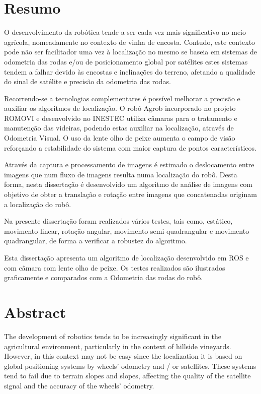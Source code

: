 \chapter*{Resumo}



O desenvolvimento da robótica tende a ser cada vez mais significativo no meio agrícola, nomeadamente no contexto de vinha de encosta. Contudo, este contexto pode não ser facilitador uma vez à localização no mesmo se baseia em sistemas de odometria das rodas e/ou de posicionamento global por satélites estes sistemas tendem a falhar devido às encostas  e inclinações do terreno, afetando a qualidade do sinal de satélite e precisão da odometria das rodas.

Recorrendo-se a  tecnologias complementares é possível melhorar a precisão e auxiliar os algoritmos de localização. O robô Agrob incorporado no projeto ROMOVI e desenvolvido no INESTEC  utiliza câmaras para o tratamento e manutenção das videiras, podendo estas auxiliar na localização, através de Odometria Visual. O uso da lente olho de peixe aumenta o campo de visão reforçando a estabilidade do sistema com maior captura de pontos característicos.

Através da captura e processamento de imagens é estimado o deslocamento entre imagens que num fluxo de imagens resulta numa localização do robô. Desta forma, nesta dissertação é desenvolvido um algoritmo de análise de imagens com objetivo de obter a translação e rotação entre imagens que concatenadas originam a localização do robô.


Na presente dissertação foram realizados vários testes, tais como, estático, movimento linear, rotação angular, movimento semi-quadrangular e movimento quadrangular, de forma a verificar a robustez do algoritmo.


Esta dissertação apresenta um algoritmo de localização desenvolvido em ROS e com câmara com lente olho de peixe. Os testes realizados são ilustrados graficamente e comparados com a Odometria das rodas do robô.


\chapter*{Abstract}


The development of robotics tends to be increasingly significant in the agricultural environment, particularly in the context of hillside vineyards. However, in this context may not be easy since the localization it is based on global positioning systems by wheels' odometry and / or satellites. These systems tend to fail due to terrain slopes and slopes, affecting the quality of the satellite signal and the accuracy of the wheels' odometry.


